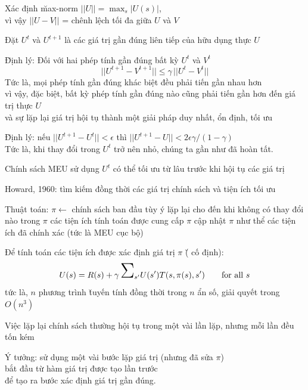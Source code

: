 \documentclass{article}
\begin{document}
\begin{huge}
{{{{\textwidth
{}


Xác định \u{max-norm} $||U|| = \max_s |U(s)|$,\\
vì vậy $||U-V||$ = chênh lệch tối đa giữa $U$ và $V$

Đặt $U^t$ và $U^{t+1}$ là các giá trị gần đúng liên tiếp của hữu dụng thực $U$

\u{Định lý}: Đối với hai phép tính gần đúng bất kỳ $U^t$ và $V^t$
\[ ||U^{t+1}-V^{t+1}|| \leq \gamma\, ||U^{t}-V^{t}|| \]
Tức là, mọi phép tính gần đúng khác biệt đều phải tiến gần nhau hơn\\
vì vậy, đặc biệt, bất kỳ phép tính gần đúng nào cũng phải tiến gần hơn đến giá trị thực $U$\\
và sự lặp lại giá trị hội tụ thành một giải pháp duy nhất, ổn định, tối ưu

\u{Định lý}: nếu $||U^{t+1} - U^t||<\epsilon$ thì $||U^{t+1} - U||<2\epsilon\gamma/(1-\gamma)$\\
Tức là, khi thay đổi trong $U^t$ trở nên nhỏ, chúng ta gần như đã hoàn tất.

Chính sách MEU sử dụng $U^t$ có thể tối ưu từ lâu trước khi hội tụ các giá trị


Howard, 1960: tìm kiếm đồng thời các giá trị chính sách và tiện ích tối ưu

Thuật toán:\al
  $\pi \leftarrow {}$ chính sách ban đầu tùy ý\al
  lặp lại cho đến khi không có thay đổi nào trong $\pi$\nl
    các tiện ích tính toán được cung cấp $\pi$ \nl
    cập nhật $\pi$ như thể các tiện ích đã chính xác (tức là MEU cục bộ)

Để tính toán các tiện ích được xác định giá trị $\pi$ (\u{} cố định):
\[ U(s) = R(s) + \gamma\,\mysum_{s'} U(s') T(s,\pi(s),s')\qquad \mbox{for all } s \]
tức là, $n$ phương trình \u{tuyến tính} đồng thời trong $n$ ẩn số,
giải quyết trong $O(n^3)$


Việc lặp lại chính sách thường hội tụ trong một vài lần lặp, nhưng mỗi lần đều tốn kém

Ý tưởng: sử dụng một vài bước lặp giá trị (nhưng đã sửa $\pi$) \\
bắt đầu từ hàm giá trị được tạo lần trước \\
để tạo ra bước xác định giá trị gần đúng.

}}}}
\end{huge}
\end{document}
